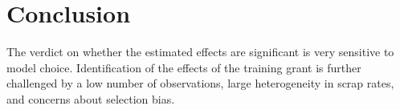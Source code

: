 \section{Conclusion}
\label{s:conclusion}
The verdict on whether the estimated effects are significant is very sensitive to model choice. Identification of the effects of the training grant is further challenged by a low number of observations, large heterogeneity in scrap rates, and concerns about selection bias.
